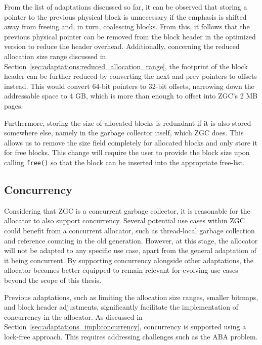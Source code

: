 From the list of adaptations discussed so far, it can be observed that storing a pointer to the previous physical block is unnecessary if the emphasis is shifted away from freeing and, in turn, coalescing blocks. From this, it follows that the previous physical pointer can be removed from the block header in the optimized version to reduce the header overhead. Additionally, concerning the reduced allocation size range discussed in Section~\ref{sec:adaptations:reduced_allocation_range}, the footprint of the block header can be further reduced by converting the next and prev pointers to offsets instead. This would convert 64-bit pointers to 32-bit offsets, narrowing down the addressable space to 4 GB, which is more than enough to offset into ZGC's 2 MB pages.

Furthermore, storing the size of allocated blocks is redundant if it is also stored somewhere else, namely in the garbage collector itself, which ZGC does. This allows us to remove the size field completely for allocated blocks and only store it for free blocks. This change will require the user to provide the block size upon calling \texttt{free()} so that the block can be inserted into the appropriate free-list.

\subsection{Concurrency}

Considering that ZGC is a concurrent garbage collector, it is reasonable for the allocator to also support concurrency. Several potential use cases within ZGC could benefit from a concurrent allocator, such as thread-local garbage collection and reference counting in the old generation. However, at this stage, the allocator will not be adapted to any specific use case, apart from the general adaptation of it being concurrent. By supporting concurrency alongside other adaptations, the allocator becomes better equipped to remain relevant for evolving use cases beyond the scope of this thesis.

Previous adaptations, such as limiting the allocation size ranges, smaller bitmaps, and block header adjustments, significantly facilitate the implementation of concurrency in the allocator. As discussed in Section~\ref{sec:adaptations_impl:concurrency}, concurrency is supported using a lock-free approach. This requires addressing challenges such as the ABA problem.

